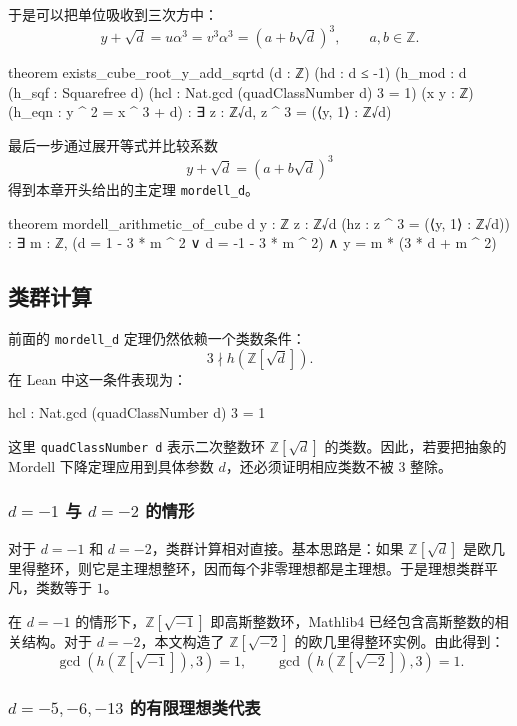 于是可以把单位吸收到三次方中：
\[
y+\sqrt d=u\alpha^3 = v^3\alpha^3 =(a+b\sqrt d)^3,
\qquad a,b\in\mathbb Z.
\]

\begin{leanlisting}
theorem exists_cube_root_y_add_sqrtd
    (d : ℤ) (hd : d ≤ -1)
    (h_mod : d %
    (h_sqf : Squarefree d)
    (hcl : Nat.gcd (quadClassNumber d) 3 = 1)
    (x y : ℤ) (h_eqn : y ^ 2 = x ^ 3 + d) :
    ∃ z : ℤ√d, z ^ 3 = (⟨y, 1⟩ : ℤ√d)
\end{leanlisting}

最后一步通过展开等式并比较系数
\[
y+\sqrt d=(a+b\sqrt d)^3
\]
得到本章开头给出的主定理 \texttt{mordell\_d}。

\begin{leanlisting}
theorem mordell_arithmetic_of_cube {d y : ℤ} {z : ℤ√d}
    (hz : z ^ 3 = (⟨y, 1⟩ : ℤ√d)) :
    ∃ m : ℤ, (d = 1 - 3 * m ^ 2 ∨ d = -1 - 3 * m ^ 2) ∧
      y = m * (3 * d + m ^ 2)
\end{leanlisting}

\subsection{类群计算}

前面的 \texttt{mordell\_d} 定理仍然依赖一个类数条件：
\[
3\nmid h(\mathbb Z[\sqrt d]).
\]
在 Lean 中这一条件表现为：
\begin{leanlisting}
hcl : Nat.gcd (quadClassNumber d) 3 = 1
\end{leanlisting}
这里 \texttt{quadClassNumber d} 表示二次整数环 \(\mathbb Z[\sqrt d]\) 的类数。因此，若要把抽象的 Mordell 下降定理应用到具体参数 \(d\)，还必须证明相应类数不被 \(3\) 整除。

\subsubsection{\(d=-1\) 与 \(d=-2\) 的情形}

对于 \(d=-1\) 和 \(d=-2\)，类群计算相对直接。基本思路是：如果 \(\mathbb Z[\sqrt d]\) 是欧几里得整环，则它是主理想整环，因而每个非零理想都是主理想。于是理想类群平凡，类数等于 \(1\)。

在 \(d=-1\) 的情形下，\(\mathbb Z[\sqrt{-1}]\) 即高斯整数环，Mathlib4 已经包含高斯整数的相关结构。对于 \(d=-2\)，本文构造了 \(\mathbb Z[\sqrt{-2}]\) 的欧几里得整环实例。由此得到：
\[
\gcd(h(\mathbb Z[\sqrt{-1}]),3)=1,
\qquad
\gcd(h(\mathbb Z[\sqrt{-2}]),3)=1.
\]

\subsubsection{\(d=-5,-6,-13\) 的有限理想类代表}

